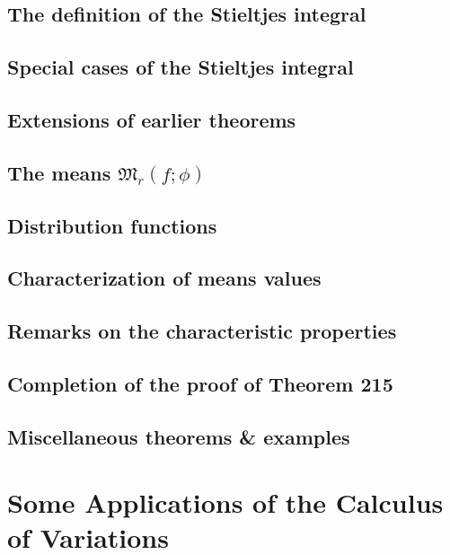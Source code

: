 \documentclass[oneside]{book}
\numberwithin{equation}{section}
\begin{document}
\subsection{The definition of the Stieltjes integral}

\subsection{Special cases of the Stieltjes integral}

\subsection{Extensions of earlier theorems}

\subsection{The means $\mathfrak{M}_r(f;\phi)$}

\subsection{Distribution functions}

\subsection{Characterization of means values}

\subsection{Remarks on the characteristic properties}

\subsection{Completion of the proof of Theorem 215}

\subsection{Miscellaneous theorems \& examples}


\section{Some Applications of the Calculus of Variations}
\end{document}
